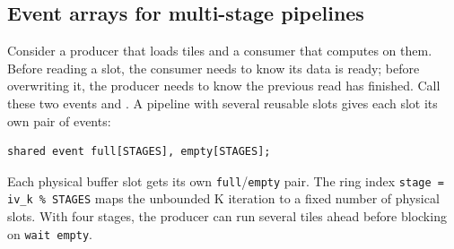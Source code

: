 \subsection*{Event arrays for multi-stage pipelines}

Consider a producer that loads tiles and a consumer that computes on them. Before reading a slot, the consumer needs to know its data is ready; before overwriting it, the producer needs to know the previous read has finished. Call these two events \co@full@ and \co@empty@. A pipeline with several reusable slots gives each slot its own pair of events:

\begin{lstlisting}[language=croqtile,caption={Event arrays for multi-stage pipelines}]
shared event full[STAGES], empty[STAGES];
\end{lstlisting}

Each physical buffer slot gets its own \texttt{full}/\texttt{empty} pair. The ring index \texttt{stage = iv\_\allowbreak{}k \% STAGES} maps the unbounded K iteration to a fixed number of physical slots. With four stages, the producer can run several tiles ahead before blocking on \texttt{wait empty}.
